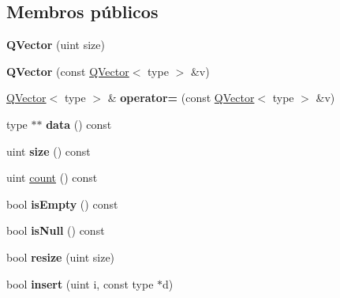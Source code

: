 \subsection*{Membros públicos}
\begin{DoxyCompactItemize}
\item 
\hypertarget{class_q_vector_a2f39a6ea0e000cfc4a0f789cc5065311}{{\bfseries Q\-Vector} (uint size)}\label{class_q_vector_a2f39a6ea0e000cfc4a0f789cc5065311}

\item 
\hypertarget{class_q_vector_a1639e6e5c56adfd9b1975414944883cb}{{\bfseries Q\-Vector} (const \hyperlink{class_q_vector}{Q\-Vector}$<$ type $>$ \&v)}\label{class_q_vector_a1639e6e5c56adfd9b1975414944883cb}

\item 
\hypertarget{class_q_vector_a5402e3c47c4217e805c0e33acdabbf6a}{\hyperlink{class_q_vector}{Q\-Vector}$<$ type $>$ \& {\bfseries operator=} (const \hyperlink{class_q_vector}{Q\-Vector}$<$ type $>$ \&v)}\label{class_q_vector_a5402e3c47c4217e805c0e33acdabbf6a}

\item 
\hypertarget{class_q_vector_a3a3264c4ea1e5140c4d6c454a3aa4346}{type $\ast$$\ast$ {\bfseries data} () const }\label{class_q_vector_a3a3264c4ea1e5140c4d6c454a3aa4346}

\item 
\hypertarget{class_q_vector_a7e63723212bed1ca52f0fe57e58b812e}{uint {\bfseries size} () const }\label{class_q_vector_a7e63723212bed1ca52f0fe57e58b812e}

\item 
uint \hyperlink{class_q_vector_a774149fc271ebaba2aabcd183a836e8f}{count} () const 
\item 
\hypertarget{class_q_vector_a479432127ee77145cc19d6a2d1590821}{bool {\bfseries is\-Empty} () const }\label{class_q_vector_a479432127ee77145cc19d6a2d1590821}

\item 
\hypertarget{class_q_vector_ac02f2a4d7312eb91f40980adfd4e31b2}{bool {\bfseries is\-Null} () const }\label{class_q_vector_ac02f2a4d7312eb91f40980adfd4e31b2}

\item 
\hypertarget{class_q_vector_a87fbd3271213ccbe5789ac30908cdddb}{bool {\bfseries resize} (uint size)}\label{class_q_vector_a87fbd3271213ccbe5789ac30908cdddb}

\item 
\hypertarget{class_q_vector_a0bb4dc482bedee8a49c6c53ea0334f71}{bool {\bfseries insert} (uint i, const type $\ast$d)}\label{class_q_vector_a0bb4dc482bedee8a49c6c53ea0334f71}


\end{DoxyCompactItemize}
